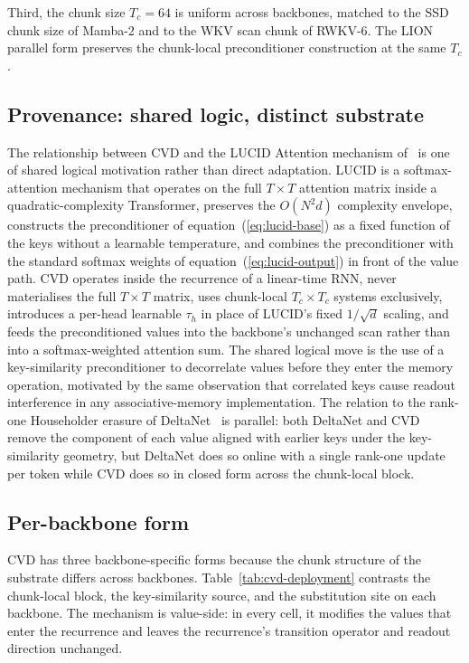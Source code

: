 Third, the chunk size $T_{c} = 64$ is uniform across backbones,
matched to the SSD chunk size of Mamba-2 and to the WKV scan
chunk of RWKV-6. The LION parallel form preserves the chunk-local
preconditioner construction at the same $T_{c}$.

\subsection{Provenance: shared logic, distinct substrate}

The relationship between CVD and the LUCID Attention mechanism
of~\citet{duvvuri2026lucid} is one of shared logical motivation
rather than direct adaptation. LUCID is a softmax-attention
mechanism that operates on the full $T \times T$ attention matrix
inside a quadratic-complexity Transformer, preserves the
$O(N^{2} d)$ complexity envelope, constructs the preconditioner of
equation~(\ref{eq:lucid-base}) as a fixed function of the keys
without a learnable temperature, and combines the preconditioner
with the standard softmax weights of
equation~(\ref{eq:lucid-output}) in front of the value path. CVD
operates inside the recurrence of a linear-time RNN, never
materialises the full $T \times T$ matrix, uses chunk-local
$T_{c} \times T_{c}$ systems exclusively, introduces a per-head
learnable $\tau_{h}$ in place of LUCID's fixed $1 / \sqrt{d}$
scaling, and feeds the preconditioned values into the backbone's
unchanged scan rather than into a softmax-weighted attention sum.
The shared logical move is the use of a key-similarity
preconditioner to decorrelate values before they enter the memory
operation, motivated by the same observation that correlated keys
cause readout interference in any associative-memory
implementation. The relation to the rank-one Householder erasure
of DeltaNet~\cite{schlag2021deltanet, yang2024deltanet} is
parallel: both DeltaNet and CVD remove the component of each value
aligned with earlier keys under the key-similarity geometry, but
DeltaNet does so online with a single rank-one update per token
while CVD does so in closed form across the chunk-local block.

\subsection{Per-backbone form}

CVD has three backbone-specific forms because the chunk structure
of the substrate differs across backbones.
Table~\ref{tab:cvd-deployment} contrasts the chunk-local block,
the key-similarity source, and the substitution site on each
backbone. The mechanism is value-side: in every cell, it modifies
the values that enter the recurrence and leaves the recurrence's
transition operator and readout direction unchanged.

